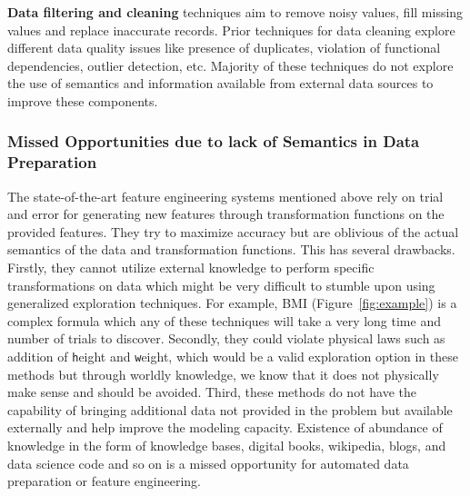 \documentclass[sigconf, nonacm]{acmart}
\begin{document}
\noindent \textbf{Data filtering and cleaning} techniques aim to remove noisy values, fill missing values and replace inaccurate records. Prior techniques for data cleaning explore different data quality issues like presence of duplicates, violation of functional dependencies, outlier detection, etc. Majority of these techniques do not explore the use of semantics and information available from external data sources to improve these components.



\subsubsection{Missed Opportunities due to lack of Semantics in Data Preparation}
The state-of-the-art feature engineering systems mentioned above rely on trial and error for generating new features through transformation functions on the provided features. They try to maximize accuracy but are oblivious of the actual semantics of the data and transformation functions. This has several drawbacks. 
Firstly, they cannot utilize external knowledge to perform specific transformations on data which might be very difficult to stumble upon using generalized exploration techniques. For example, BMI (Figure~\ref{fig:example}) is a complex formula which any of these techniques will take a very long time and number of trials to discover. Secondly, they could violate physical laws such as addition of {\texttt height} and {\texttt weight}, which would be a valid exploration option in these methods but through worldly knowledge, we know that it does not physically make sense and should be avoided. Third, these methods do not have the capability of bringing additional data not provided in the problem but available externally and help improve the modeling capacity. 
Existence of abundance of knowledge in the form of knowledge bases, digital books, wikipedia, blogs, and data science code and so on is a missed opportunity for automated data preparation or feature engineering.



\end{document}
